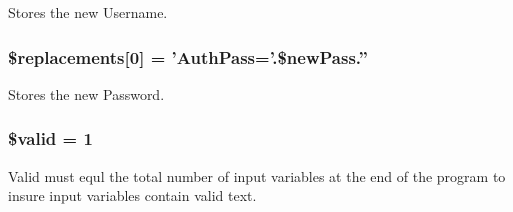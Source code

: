 \-Stores the new \-Username. \hypertarget{changeEmail_8php_a145791c674c2ced0890355ae5bdb6847}{
\subsubsection[{\$replacements}]{\setlength{\rightskip}{0pt plus 5cm}\$replacements\mbox{[}0\mbox{]} = '\-Auth\-Pass='.\$new\-Pass.''}}\label{changeEmail_8php_a145791c674c2ced0890355ae5bdb6847}
\-Stores the new \-Password. \hypertarget{changeEmail_8php_a0587674d27d00ef497e08e53ccf45bbb}{
\subsubsection[{\$valid}]{\setlength{\rightskip}{0pt plus 5cm}\$valid = 1}}\label{changeEmail_8php_a0587674d27d00ef497e08e53ccf45bbb}
\-Valid must equl the total number of input variables at the end of the program to insure input variables contain valid text. 